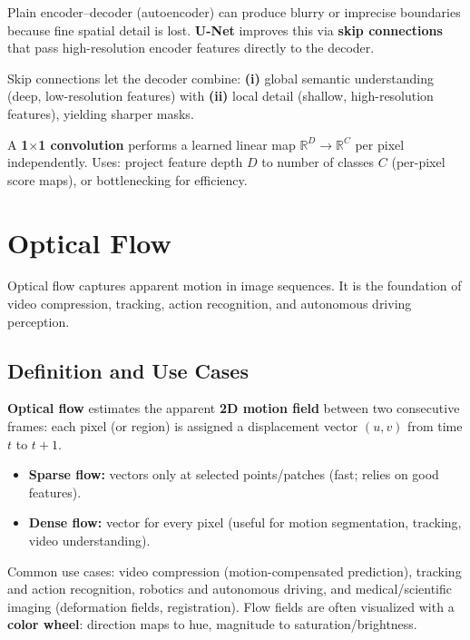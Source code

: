 \documentclass[11pt, oneside]{book}
\newcommand{\R}{\mathbb{R}}
\begin{document}
\begin{defbox}[title={U-Net}]
Plain encoder--decoder (autoencoder) can produce blurry or imprecise boundaries because fine spatial detail is lost.
\textbf{U-Net} improves this via \textbf{skip connections} that pass high-resolution encoder features directly to the decoder.
\end{defbox}

Skip connections let the decoder combine: \textbf{(i)} global semantic understanding (deep, low-resolution features)
with \textbf{(ii)} local detail (shallow, high-resolution features), yielding sharper masks.

A \textbf{1$\times$1 convolution} performs a learned linear map $\R^{D}\to\R^{C}$ per pixel independently.
Uses: project feature depth $D$ to number of classes $C$ (per-pixel score maps), or bottlenecking for efficiency.


\chapter{Optical Flow}

Optical flow captures apparent motion in image sequences. It is the foundation of video compression,
tracking, action recognition, and autonomous driving perception.

\section{Definition and Use Cases}

\begin{defbox}[title={Optical Flow}]
\textbf{Optical flow} estimates the apparent \textbf{2D motion field} between two consecutive frames:
each pixel (or region) is assigned a displacement vector $(u,v)$ from time $t$ to $t+1$.
\begin{itemize}
  \item \textbf{Sparse flow:} vectors only at selected points/patches (fast; relies on good features).
  \item \textbf{Dense flow:} vector for every pixel (useful for motion segmentation, tracking, video understanding).
\end{itemize}
\end{defbox}

Common use cases: video compression (motion-compensated prediction), tracking and action recognition,
robotics and autonomous driving, and medical/scientific imaging (deformation fields, registration).
Flow fields are often visualized with a \textbf{color wheel}: direction maps to hue, magnitude to saturation/brightness.
\end{document}
